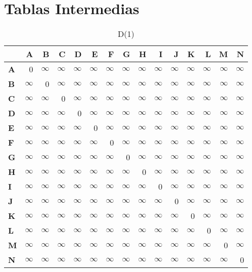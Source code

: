 \documentclass{article}
\newcommand{\INF}{$\infty$}
\begin{document}
\section*{Tablas Intermedias}
\begin{table}[H]\centering
\caption{D(1)}
\begin{tabular}{l r r r r r r r r r r r r r r}
\toprule
 & \textbf{A} & \textbf{B} & \textbf{C} & \textbf{D} & \textbf{E} & \textbf{F} & \textbf{G} & \textbf{H} & \textbf{I} & \textbf{J} & \textbf{K} & \textbf{L} & \textbf{M} & \textbf{N}\\\midrule
\textbf{A} & 0 & \INF & \INF & \INF & \INF & \INF & \INF & \INF & \INF & \INF & \INF & \INF & \INF & \INF \\
\textbf{B} & \INF & 0 & \INF & \INF & \INF & \INF & \INF & \INF & \INF & \INF & \INF & \INF & \INF & \INF \\
\textbf{C} & \INF & \INF & 0 & \INF & \INF & \INF & \INF & \INF & \INF & \INF & \INF & \INF & \INF & \INF \\
\textbf{D} & \INF & \INF & \INF & 0 & \INF & \INF & \INF & \INF & \INF & \INF & \INF & \INF & \INF & \INF \\
\textbf{E} & \INF & \INF & \INF & \INF & 0 & \INF & \INF & \INF & \INF & \INF & \INF & \INF & \INF & \INF \\
\textbf{F} & \INF & \INF & \INF & \INF & \INF & 0 & \INF & \INF & \INF & \INF & \INF & \INF & \INF & \INF \\
\textbf{G} & \INF & \INF & \INF & \INF & \INF & \INF & 0 & \INF & \INF & \INF & \INF & \INF & \INF & \INF \\
\textbf{H} & \INF & \INF & \INF & \INF & \INF & \INF & \INF & 0 & \INF & \INF & \INF & \INF & \INF & \INF \\
\textbf{I} & \INF & \INF & \INF & \INF & \INF & \INF & \INF & \INF & 0 & \INF & \INF & \INF & \INF & \INF \\
\textbf{J} & \INF & \INF & \INF & \INF & \INF & \INF & \INF & \INF & \INF & 0 & \INF & \INF & \INF & \INF \\
\textbf{K} & \INF & \INF & \INF & \INF & \INF & \INF & \INF & \INF & \INF & \INF & 0 & \INF & \INF & \INF \\
\textbf{L} & \INF & \INF & \INF & \INF & \INF & \INF & \INF & \INF & \INF & \INF & \INF & 0 & \INF & \INF \\
\textbf{M} & \INF & \INF & \INF & \INF & \INF & \INF & \INF & \INF & \INF & \INF & \INF & \INF & 0 & \INF \\
\textbf{N} & \INF & \INF & \INF & \INF & \INF & \INF & \INF & \INF & \INF & \INF & \INF & \INF & \INF & 0 \\
\bottomrule
\end{tabular}
\end{table}
\end{document}
